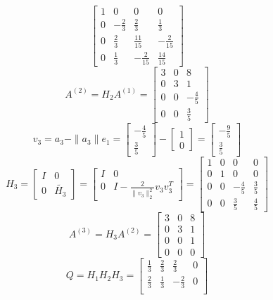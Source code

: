\documentclass[english,onecolumn]{IEEEtran}
\begin{document}
\begin{enumerate}
$$\begin{bmatrix}
    		1 & 0 & 0 & 0\\
    		0 & -\frac{2}{3} &\frac{2}{3} & \frac{1}{3}\\
    		0 & \frac{2}{3} & \frac{11}{15} & -\frac{2}{15}\\
    		0 & \frac{1}{3} & -\frac{2}{15} & \frac{14}{15}
    	\end{bmatrix}$$
    	$$A^{(2)} = H_2A^{(1)} = \begin{bmatrix}
    		3 & 0 & 8 \\
    		0 & 3 & 1\\
    		0 & 0 & -\frac{4}{5}\\
    		0 & 0 & \frac{3}{5} \end{bmatrix}$$
    	$$v_3 = a_3 - \|a_3\|e_1 = \begin{bmatrix}
    		-\frac{4}{5} \\ \frac{3}{5}
    	\end{bmatrix}- \begin{bmatrix}
    		1 \\ 0
    	\end{bmatrix}=\begin{bmatrix}
    		-\frac{9}{5} \\ \frac{3}{5}
    	\end{bmatrix}$$
    	$$H_3 = \begin{bmatrix}
    		I & 0 \\
    		0 & \tilde{H_3} 
    	\end{bmatrix}=\begin{bmatrix}
    		I & 0 \\
    		0 & I-\frac{2}{\|v_3\|_2^2}v_3v_3^T \end{bmatrix}=\begin{bmatrix}
    		1 & 0 & 0 & 0\\
    		0 & 1 &0 & 0\\
    		0 & 0 & -\frac{4}{5} & \frac{3}{5}\\
    		0 & 0 & \frac{3}{5} & \frac{4}{5}
    	\end{bmatrix}$$
    	$$A^{(3)} = H_3A^{(2)} =  \begin{bmatrix}
    		3 & 0 & 8 \\
    		0 & 3 & 1\\
    		0 & 0 & 1\\
    		0 & 0 & 0 \end{bmatrix}$$
    	$$Q = H_1H_2H_3 = \begin{bmatrix}
    		\frac{1}{3} & \frac{2}{3} & \frac{2}{3} & 0\\
    		\frac{2}{3} & \frac{1}{3} &-\frac{2}{3} & 0\\

\end{bmatrix}$$
\end{enumerate}
\end{document}
